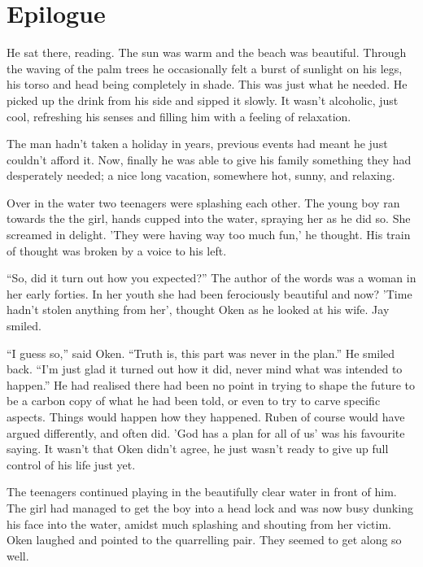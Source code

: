 \section{Epilogue}



He sat there, reading.  The sun was warm and the beach was beautiful.  Through the waving of the palm trees he occasionally felt a burst of sunlight on his legs, his torso and head being completely in shade.  This was just what he needed.  He picked up the drink from his side and sipped it slowly.  It wasn't alcoholic, just cool, refreshing his senses and filling him with a feeling of relaxation.

The man hadn't taken a holiday in years, previous events had meant he just couldn't afford it.  Now, finally he was able to give his family something they had desperately needed; a nice long vacation, somewhere hot, sunny, and relaxing.

Over in the water two teenagers were splashing each other.  The young boy ran towards the the girl, hands cupped into the water, spraying her as he did so.  She screamed in delight.  'They were having way too much fun,' he thought.  His train of thought was broken by a voice to his left.

``So, did it turn out how you expected?''  The author of the words was a woman in her early forties.  In her youth she had been ferociously beautiful and now?  'Time hadn't stolen anything from her', thought Oken as he looked at his wife.  Jay smiled.

``I guess so,'' said Oken.  ``Truth is, this part was never in the plan.''  He smiled back.  ``I'm just glad it turned out how it did, never mind what was intended to happen.''  He had realised there had been no point in trying to shape the future to be a carbon copy of what he had been told, or even to try to carve specific aspects.  Things would happen how they happened.  Ruben of course would have argued differently, and often did.  'God has a plan for all of us' was his favourite saying.  It wasn't that Oken didn't agree, he just wasn't ready to give up full control of his life just yet.  

The teenagers continued playing in the beautifully clear water in front of him.  The girl had managed to get the boy into a head lock and was now busy dunking his face into the water, amidst much splashing and shouting from her victim.  Oken laughed and pointed to the quarrelling pair.  They seemed to get along so well.

